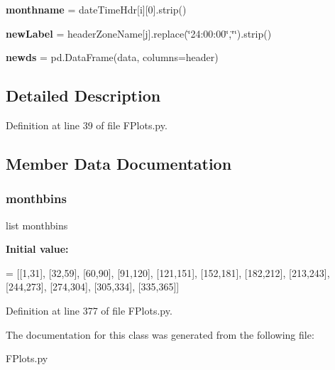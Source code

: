 \begin{DoxyCompactItemize}
\mbox{\label{class_f_plots_1_1_frm_plots_ac8d680af67b4d55b1f5edbe1737af284}} 
{\bfseries monthname} = date\+Time\+Hdr\mbox{[}i\mbox{]}\mbox{[}0\mbox{]}.strip()
\item 
\mbox{\label{class_f_plots_1_1_frm_plots_a106a0816704d71f51f1ab2a644e67d36}} 
{\bfseries new\+Label} = header\+Zone\+Name\mbox{[}j\mbox{]}.replace(\char`\"{}24\+:00\+:00\char`\"{},\char`\"{}\char`\"{}).strip()
\item 
\mbox{\label{class_f_plots_1_1_frm_plots_ae0136d305cfdac2f75f135306636dfd0}} 
{\bfseries newds} = pd.\+Data\+Frame(data, columns=header)
\end{DoxyCompactItemize}


\subsection{Detailed Description}


Definition at line 39 of file F\+Plots.\+py.



\subsection{Member Data Documentation}
\mbox{\label{class_f_plots_1_1_frm_plots_a424c630891096946c5bb1466cf1e466b}} 
\subsubsection{\texorpdfstring{monthbins}{monthbins}}
{\footnotesize\ttfamily list monthbins\hspace{0.3cm}{\ttfamily [static]}}

{\bfseries Initial value\+:}
\begin{DoxyCode}
=  [[1,31],
                            [32,59],
                            [60,90],
                            [91,120],
                            [121,151],
                            [152,181],
                            [182,212],
                            [213,243],
                            [244,273],
                            [274,304],
                            [305,334],
                            [335,365]]
\end{DoxyCode}


Definition at line 377 of file F\+Plots.\+py.



The documentation for this class was generated from the following file\+:\begin{DoxyCompactItemize}
\item 
F\+Plots.\+py\end{DoxyCompactItemize}
